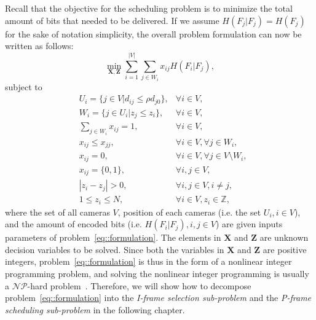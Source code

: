 Recall that the objective for the scheduling problem is to minimize the total amount of bits that needed to be delivered.
If we assume $H(F_j|F_j) = H(F_j)$ for the sake of notation simplicity, the overall problem formulation can now be written as follows:
\begin{equation*}
\underset{\mathbf{X}, \mathbf{Z}}{\min}
\sum_{i=1}^{|V|} \sum_{j \in W_i}  x_{ij} H(F_i|F_j),
\end{equation*}
subject to
\begin{align}
&U_i = \{ j \in V | d_{ij} \leq \rho d_{j0} \}, &\forall i \in V, \nonumber \\
&W_i = \{ j \in U_i | z_j \leq z_i \}, &\forall i \in V, \nonumber \\
&\sum_{j \in W_i} x_{ij} = 1, &\forall i \in V, \nonumber \\
&x_{ij} \leq x_{jj}, &\forall i \in V, \forall j \in W_i, \nonumber \\
&x_{ij} = 0, &\forall i \in V, \forall j \in V \setminus W_i, \nonumber \\
&x_{ij} = \{0,1\}, &\forall i,j \in V, \nonumber \\
&|z_i - z_j| > 0, &\forall i,j \in V, i \neq j, \nonumber \\
&1 \leq z_i \leq N, &\forall i \in V, z_i \in \mathbb{Z},
\label{eq::formulation}
\end{align}
where the set of all cameras $V$, position of each cameras (i.e. the set $U_i, i \in V$), and the amount of encoded bits (i.e. $H(F_i|F_j), i,j \in V$) are given inputs parameters of problem~\eqref{eq::formulation}.
The elements in $\mathbf{X}$ and $\mathbf{Z}$ are unknown decision variables to be solved.
Since both the variables in $\mathbf{X}$ and $\mathbf{Z}$ are positive integers, problem~\eqref{eq::formulation} is thus in the form of a nonlinear integer programming problem, and solving the nonlinear integer programming is usually a $\mathcal{NP}$-hard problem~\cite{NIP}.
Therefore, we will show how to decompose problem~\eqref{eq::formulation} into the \emph{I-frame selection sub-problem} and the \emph{P-frame scheduling sub-problem} in the following chapter.
%
